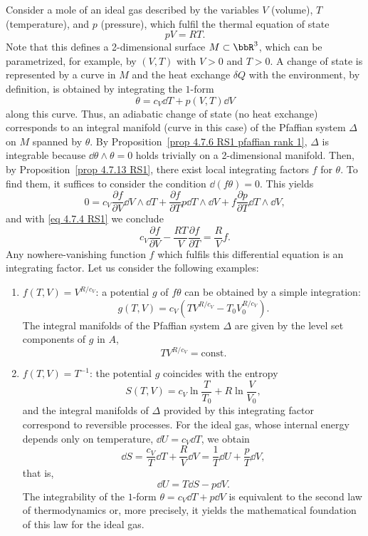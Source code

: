 \begin{example}
    Consider a mole of an ideal gas described by the variables $V$ (volume), $T$ (temperature), and $p$ (pressure), which fulfil the thermal equation of state
    \[pV=RT.\label{eq 4.7.4 RS1}\]
    Note that this defines a 2-dimensional surface $M\subset \bbR^3$, which can be parametrized, for example, by $(V,T)$ with $V>0$ and $T>0$. A change of state is represented by a curve in $M$ and the heat exchange $\delta Q$ with the environment, by definition, is obtained by integrating the $1$-form
    \[\theta=c_V\dd T+p(V,T)\dd V\]
    along this curve. Thus, an adiabatic change of state (no heat exchange) corresponds to an integral manifold (curve in this case) of the Pfaffian system $\Delta$ on $M$ spanned by $\theta$. By Proposition~\ref{prop 4.7.6 RS1 pfaffian rank 1}, $\Delta$ is integrable because $\dd\theta\wedge\theta=0$ holds trivially on a 2-dimensional manifold. Then, by Proposition~\ref{prop 4.7.13 RS1}, there exist local integrating factors $f$ for $\theta$. To find them, it suffices to consider the condition $\dd(f\theta)=0$. This yields
    \[0=c_V\frac{\partial f}{\partial V}\dd V\wedge \dd T+\frac{\partial f}{\partial T}p\dd T\wedge \dd V+f\frac{\partial p}{\partial T}\dd T\wedge \dd V,\]
    and with \eqref{eq 4.7.4 RS1} we conclude
    \[c_V\frac{\partial f}{\partial V}-\frac{RT}{V}\frac{\partial f}{\partial T}=\frac RV f.\]
    Any nowhere-vanishing function $f$ which fulfils this differential equation is an integrating factor. Let us consider the following examples:
    \begin{enumerate}
        \item $f(T,V)=V^{R/c_V}$: a potential $g$ of $f\theta$ can be obtained by a simple integration:
        \[g(T,V)=c_V\left(TV^{R/c_V}-T_0V_0^{R/c_V}\right).\]
        The integral manifolds of the Pfaffian system $\Delta$ are given by the level set components of $g$ in $A$, 
        \[TV^{R/c_V}=\mathrm{const}.\]
        \item $f(T,V)=T^{-1}$: the potential $g$ coincides with the entropy
        \[S(T,V)=c_V\ln\frac{T}{T_0}+R\ln\frac{V}{V_0},\]
        and the integral manifolds of $\Delta$ provided by this integrating factor correspond to reversible processes. For the ideal gas, whose internal energy depends only on temperature, $\dd U=c_V\dd T$, we obtain
        \[\dd S=\frac{c_V}{T}\dd T+\frac{R}{V}\dd V=\frac{1}{T}\dd U+\frac{p}{T}\dd V,\]
        that is,
        \[\dd U=T\dd S-p \dd V.\]
        The integrability of the $1$-form $\theta=c_V\dd T+p\dd V$ is equivalent to the second law of thermodynamics or, more precisely, it yields the mathematical foundation of this law for the ideal gas.
    \end{enumerate}
\end{example}





